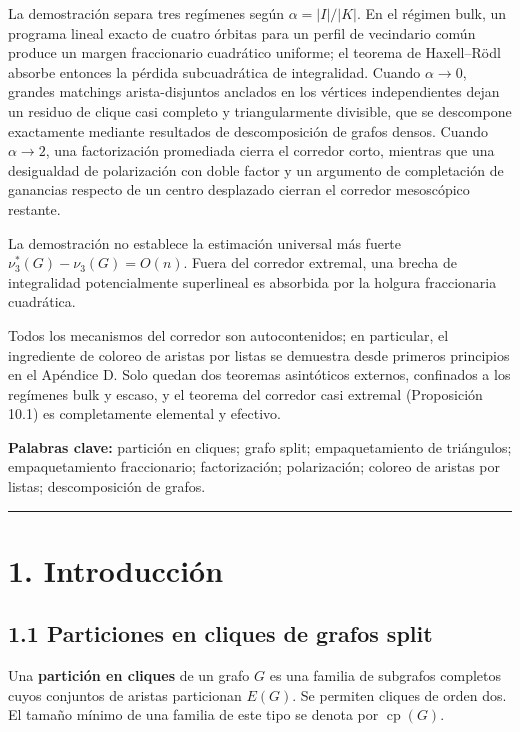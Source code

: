\documentclass[
  11pt,
]{article}
\begin{document}
La demostración separa tres regímenes según \(\alpha=|I|/|K|\). En el
régimen bulk, un programa lineal exacto de cuatro órbitas para un perfil
de vecindario común produce un margen fraccionario cuadrático uniforme;
el teorema de Haxell--Rödl absorbe entonces la pérdida subcuadrática de
integralidad. Cuando \(\alpha\to0\), grandes matchings arista-disjuntos
anclados en los vértices independientes dejan un residuo de clique casi
completo y triangularmente divisible, que se descompone exactamente
mediante resultados de descomposición de grafos densos. Cuando
\(\alpha\to2\), una factorización promediada cierra el corredor corto,
mientras que una desigualdad de polarización con doble factor y un
argumento de completación de ganancias respecto de un centro desplazado
cierran el corredor mesoscópico restante.

La demostración no establece la estimación universal más fuerte
\(\nu_3^*(G)-\nu_3(G)=O(n)\). Fuera del corredor extremal, una brecha de
integralidad potencialmente superlineal es absorbida por la holgura
fraccionaria cuadrática.

Todos los mecanismos del corredor son autocontenidos; en particular, el
ingrediente de coloreo de aristas por listas se demuestra desde primeros
principios en el Apéndice D. Solo quedan dos teoremas asintóticos
externos, confinados a los regímenes bulk y escaso, y el teorema del
corredor casi extremal (Proposición 10.1) es completamente elemental y
efectivo.

\textbf{Palabras clave:} partición en cliques; grafo split;
empaquetamiento de triángulos; empaquetamiento fraccionario;
factorización; polarización; coloreo de aristas por listas;
descomposición de grafos.

\begin{center}\rule{0.5\linewidth}{0.5pt}\end{center}

\section{1. Introducción}\label{introducciuxf3n}

\subsection{1.1 Particiones en cliques de grafos
split}\label{particiones-en-cliques-de-grafos-split}

Una \textbf{partición en cliques} de un grafo \(G\) es una familia de
subgrafos completos cuyos conjuntos de aristas particionan \(E(G)\). Se
permiten cliques de orden dos. El tamaño mínimo de una familia de este
tipo se denota por \(\operatorname{cp}(G)\).
\end{document}
